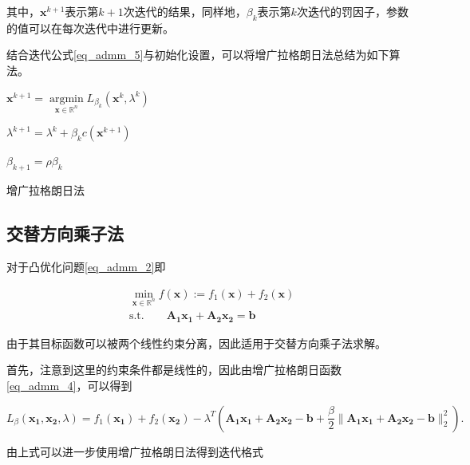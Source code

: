 其中，$\bm{x}^{k+1}$表示第$k+1$次迭代的结果，同样地，$\beta_{k}$表示第$k$次迭代的罚因子，参数的值可以在每次迭代中进行更新。

结合迭代公式\ref{eq_admm_5}与初始化设置，可以将增广拉格朗日法总结为如下算法。

\begin{algorithm}\label{alg_admm_1}

    \SetAlgoLined

     {
        $\bm{x}^{k+1} = \mathop{\mathrm{argmin}}\limits_{\bm{x}\in \mathbb{R}^{n}} L_{\beta_{k}}(\bm{x}^{k}, \lambda^{k})$
        
        $\lambda^{k+1} = \lambda^{k} + \beta_{k} c(\bm{x}^{k+1})$

        $\beta_{k+1} = \rho \beta_{k}$
    }
    \caption{增广拉格朗日法}
\end{algorithm}

\subsection{交替方向乘子法}

对于凸优化问题\ref{eq_admm_2}即

\begin{equation*}
    \begin{split}
        &\min\limits_{\bm{x}\in \mathbb{R}^{n}} f(\bm{x}) := f_{1}(\bm{x}) + f_{2}(\bm{x}) \\
        &\mathrm{s. t.} \quad\quad \bm{A_{1}x_{1}} + \bm{A_{2}x_{2}} = \bm{b} 
    \end{split}
\end{equation*}

由于其目标函数可以被两个线性约束分离，因此适用于交替方向乘子法求解。

首先，注意到这里的约束条件都是线性的，因此由增广拉格朗日函数\ref{eq_admm_4}，可以得到

\begin{equation}
    L_{\beta}(\bm{x_{1}, x_{2}}, \lambda) = f_{1}(\bm{x_{1}}) + f_{2}(\bm{x_{2}}) - \lambda^{T}(\bm{A_{1}x_{1} + A_{2}x_{2}-b} + \frac{\beta}{2}\|\bm{A_{1}x_{1} + A_{2}x_{2}-b}\|_{2}^{2}).
\end{equation}

由上式可以进一步使用增广拉格朗日法得到迭代格式

